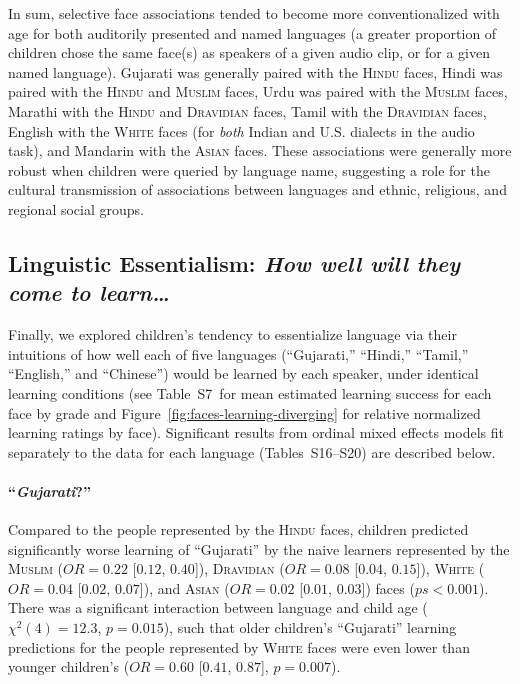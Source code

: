 \documentclass{foushee-adapted-preprint}
\newcommand{\learningmeanstab}{S7}
\newcommand{\learningmodeltabs}{S16--S20}
\begin{document}
In sum, selective face associations tended to become more conventionalized with age for both auditorily presented and named languages (a greater proportion of children chose the same face(s) as speakers of a given audio clip, or for a given named language). 
Gujarati was generally paired with the \textsc{Hindu} faces, Hindi was paired with the \textsc{Hindu} and \textsc{Muslim} faces,  Urdu was paired with the \textsc{Muslim} faces,  Marathi with the \textsc{Hindu} and \textsc{Dravidian} faces, Tamil with the \textsc{Dravidian} faces, English  with the \textsc{White} faces (for \textit{both} Indian and U.S. dialects in the audio task), and Mandarin with the \textsc{Asian} faces. 
These associations were generally more robust when children were queried by language name, suggesting a role for the cultural transmission of associations between languages and ethnic, religious, and regional social groups. 

\subsection{Linguistic Essentialism: \textit{How well will they come to learn\ldots}} 
Finally, we explored children's tendency to essentialize language via their intuitions of how well each of five languages (``Gujarati,'' ``Hindi,'' ``Tamil,'' ``English,'' and ``Chinese'') would be learned by each speaker, under identical learning conditions  
(see Table~\learningmeanstab\ for mean estimated learning success for each face by grade and Figure~\ref{fig:faces-learning-diverging} for relative normalized learning ratings by face). 
Significant results from ordinal mixed effects models fit separately to the data for each language (Tables~\learningmodeltabs) are described below. 

\paragraph{``\textit{Gujarati}?''}
Compared to the people represented by the \textsc{Hindu} faces, children predicted significantly worse learning of ``Gujarati'' by the naive learners represented by the \textsc{Muslim} ($OR=0.22$ [$0.12$, $0.40$]), \textsc{Dravidian} ($OR=0.08$ [$0.04$, $0.15$]), \textsc{White} ($OR=0.04$ [$0.02$, $0.07$]), and \textsc{Asian} ($OR=0.02$ [$0.01$, $0.03$]) faces ($ps<0.001$). 
There was a significant interaction between language and child age ($\chi^{2}(4)=12.3$, $p=0.015$), such that older children's ``Gujarati'' learning predictions for the people represented by \textsc{White} faces were even lower than younger children's ($OR=0.60$ [$0.41$, $0.87$], $p=0.007$). 
\end{document}
